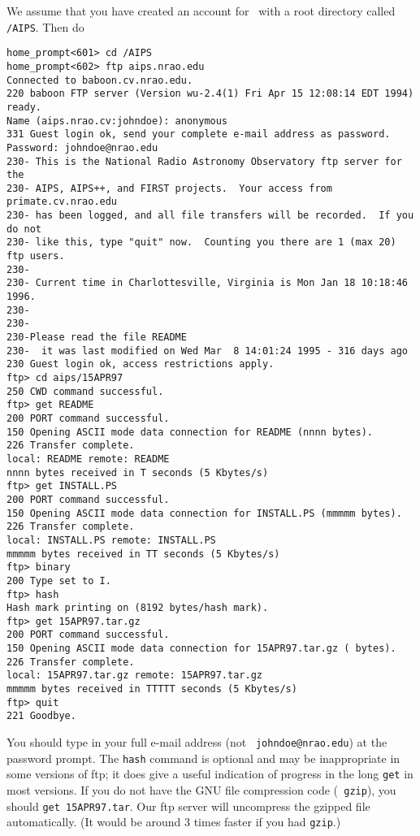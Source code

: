 We assume that you have created an account for \AIPS\ with a root
directory called \hbox{{\tt /AIPS}}.  Then do
\vskip -10pt
\begin{verbatim}
home_prompt<601> cd /AIPS
home_prompt<602> ftp aips.nrao.edu
Connected to baboon.cv.nrao.edu.
220 baboon FTP server (Version wu-2.4(1) Fri Apr 15 12:08:14 EDT 1994) ready.
Name (aips.nrao.cv:johndoe): anonymous
331 Guest login ok, send your complete e-mail address as password.
Password: johndoe@nrao.edu
230- This is the National Radio Astronomy Observatory ftp server for the
230- AIPS, AIPS++, and FIRST projects.  Your access from primate.cv.nrao.edu
230- has been logged, and all file transfers will be recorded.  If you do not
230- like this, type "quit" now.  Counting you there are 1 (max 20) ftp users.
230-
230- Current time in Charlottesville, Virginia is Mon Jan 18 10:18:46 1996.
230-
230-
230-Please read the file README
230-  it was last modified on Wed Mar  8 14:01:24 1995 - 316 days ago
230 Guest login ok, access restrictions apply.
ftp> cd aips/15APR97
250 CWD command successful.
ftp> get README
200 PORT command successful.
150 Opening ASCII mode data connection for README (nnnn bytes).
226 Transfer complete.
local: README remote: README
nnnn bytes received in T seconds (5 Kbytes/s)
ftp> get INSTALL.PS
200 PORT command successful.
150 Opening ASCII mode data connection for INSTALL.PS (mmmmm bytes).
226 Transfer complete.
local: INSTALL.PS remote: INSTALL.PS
mmmmm bytes received in TT seconds (5 Kbytes/s)
ftp> binary
200 Type set to I.
ftp> hash
Hash mark printing on (8192 bytes/hash mark).
ftp> get 15APR97.tar.gz
200 PORT command successful.
150 Opening ASCII mode data connection for 15APR97.tar.gz ( bytes).
226 Transfer complete.
local: 15APR97.tar.gz remote: 15APR97.tar.gz
mmmmm bytes received in TTTTT seconds (5 Kbytes/s)
ftp> quit
221 Goodbye.
\end{verbatim}
\vskip -10pt
You should type in your full e-mail address (not {\tt
johndoe@nrao.edu}) at the password prompt.  The {\tt hash} command is
optional and may be inappropriate in some versions of ftp; it does
give a useful indication of progress in the long {\tt get} in most
versions.  If you do not have the GNU file compression code ({\tt
gzip}), you should {\tt get 15APR97.tar}.  Our ftp server will
uncompress the gzipped file automatically.  (It would be around 3
times faster if you had {\tt gzip}.)

